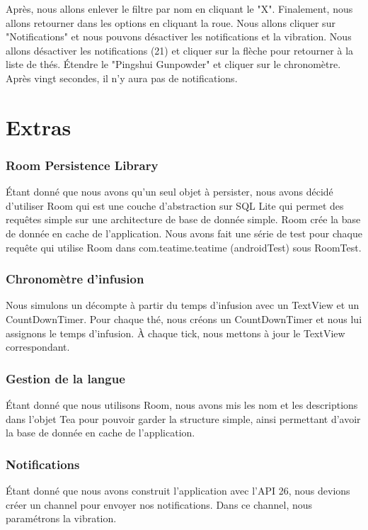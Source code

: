 \documentclass[a4paper,12pt]{article}
\begin{document}
\begin{spacing}{1}
	Après, nous allons enlever le filtre par nom en cliquant le "X".
	Finalement, nous allons retourner dans les options en cliquant la roue. Nous allons cliquer sur "Notifications" et nous pouvons désactiver les notifications et la vibration. Nous allons désactiver les notifications (21) et cliquer sur la flèche pour retourner à la liste de thés.
	Étendre le "Pingshui Gunpowder" et cliquer sur le chronomètre. Après vingt secondes, il n'y aura pas de notifications.
	\newpage
	\section*{Extras}
	\subsubsection*{Room Persistence Library}
	Étant donné que nous avons qu'un seul objet à persister, nous avons décidé d'utiliser Room qui est une couche d'abstraction sur SQL Lite qui permet des requêtes simple sur une architecture de base de donnée simple. Room crée la base de donnée en cache de l'application. Nous avons fait une série de test pour chaque requête qui utilise Room dans com.teatime.teatime (androidTest) sous RoomTest.
	\subsubsection*{Chronomètre d'infusion}
	Nous simulons un décompte à partir du temps d'infusion avec un TextView et un CountDownTimer. Pour chaque thé, nous créons un CountDownTimer et nous lui assignons le temps d'infusion. À chaque tick, nous mettons à jour le TextView correspondant.
	\subsubsection*{Gestion de la langue}
	Étant donné que nous utilisons Room, nous avons mis les nom et les descriptions dans l'objet Tea pour pouvoir garder la structure simple, ainsi permettant d'avoir la base de donnée en cache de l'application.
	\subsubsection*{Notifications}
	Étant donné que nous avons construit l'application avec l'API 26, nous devions créer un channel pour envoyer nos notifications. Dans ce channel, nous paramétrons la vibration.
	\newpage

\end{spacing}
\end{document}
